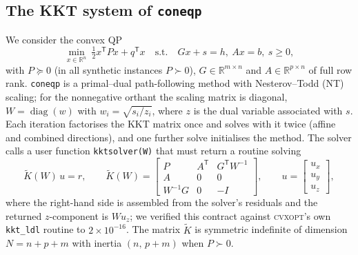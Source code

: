 \documentclass[11pt]{article}
\theoremstyle{definition}
\newcommand{\R}{\mathbb{R}}
\newcommand{\Kt}{\tilde K}
\newcommand{\T}{^{\mathsf T}}
\begin{document}
\subsection{The KKT system of \texttt{coneqp}}
We consider the convex QP
\begin{equation}\label{eq:qp}
\min_{x\in\R^n}\ \tfrac12 x\T P x + q\T x\quad\text{s.t.}\quad Gx + s = h,\ Ax=b,\ s\ge0,
\end{equation}
with $P\succeq0$ (in all synthetic instances $P\succ0$), $G\in\R^{m\times n}$ and $A\in\R^{p\times n}$ of full row rank. \texttt{coneqp} is a primal--dual path-following method with Nesterov--Todd (NT) scaling; for the nonnegative orthant the scaling matrix is diagonal, $W=\operatorname{diag}(w)$ with $w_i=\sqrt{s_i/z_i}$, where $z$ is the dual variable associated with $s$. Each iteration factorises the KKT matrix once and solves with it twice (affine and combined directions), and one further solve initialises the method. The solver calls a user function \texttt{kktsolver(W)} that must return a routine solving
\begin{equation}\label{eq:kkt}
\Kt(W)\,u = r,\qquad \Kt(W)=\begin{bmatrix} P & A\T & G\T W^{-1}\\ A & 0 & 0\\ W^{-1}G & 0 & -I\end{bmatrix},\qquad u=\begin{bmatrix}u_x\\u_y\\u_z\end{bmatrix},
\end{equation}
where the right-hand side is assembled from the solver's residuals and the returned $z$-component is $Wu_z$; we verified this contract against \textsc{cvxopt}'s own \texttt{kkt\_ldl} routine to $2\times10^{-16}$. The matrix $\Kt$ is symmetric indefinite of dimension $N=n+p+m$ with inertia $(n,\,p+m)$ when $P\succ0$.
\end{document}

